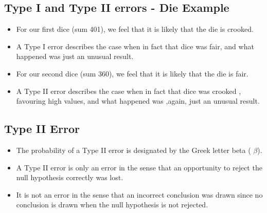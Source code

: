 \documentclass[]{report}
\begin{document}

\subsection{Type I and Type II errors - Die Example}
\begin{itemize}
\item For our first dice (sum 401), we feel that it is likely that the die is crooked.
\item A Type I error describes the case when in fact that dice was fair, and what happened was just an unusual result.
\item For our second dice (sum 360), we feel that it is likely that the die is fair.
\item A Type II error describes the case when in fact that dice was crooked , favouring high values, and what happened was ,again, just an unusual result.
\end{itemize}










\subsection{Type II Error}
\begin{itemize}

\item The probability of a Type II error is designated by the Greek letter beta ( $\beta$).
\item A Type II error is only an error in the sense that an opportunity to reject the null hypothesis correctly was lost.
\item It is not an error in the sense that an incorrect conclusion was drawn since no conclusion is drawn when the null hypothesis is not rejected.
\end{itemize}
\end{document}
